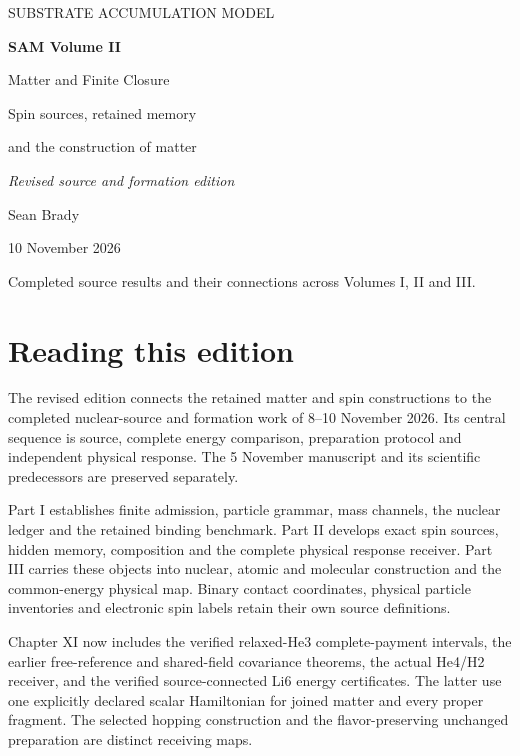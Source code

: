 
\newcommand{\VolumeRoman}{II}
\onecolumn\thispagestyle{empty}
\begin{center}\vspace*{0.8in}
{\small SUBSTRATE ACCUMULATION MODEL\par}\vspace{0.35in}
{\Huge\bfseries SAM Volume II\par}\vspace{0.15in}
{\LARGE Matter and Finite Closure\par}\vspace{0.25in}
{\large Spin sources, retained memory\par and the construction of matter\par\vspace{0.15in}\textit{Revised source and formation edition}\par}\vspace{0.4in}
{\Large Sean Brady\par}\vspace{0.12in}
{\normalsize 10 November 2026\par}\end{center}
\vfill\noindent Completed source results and their connections across Volumes I, II and III.
\clearpage{}\tableofcontents
\clearpage{}\section*{Reading this edition}
The revised edition connects the retained matter and spin constructions to
the completed nuclear-source and formation work of 8--10 November 2026.
Its central sequence is source, complete energy comparison, preparation
protocol and independent physical response. The 5 November manuscript and
its scientific predecessors are preserved separately.

Part I establishes finite admission, particle grammar, mass channels, the
nuclear ledger and the retained binding benchmark. Part II develops exact
spin sources, hidden memory, composition and the complete physical response
receiver. Part III carries these objects into nuclear, atomic and molecular
construction and the common-energy physical map. Binary contact coordinates,
physical particle inventories and electronic spin labels retain their own
source definitions.

Chapter XI now includes the verified relaxed-He3 complete-payment intervals,
the earlier free-reference and shared-field covariance theorems, the actual
He4/H2 receiver, and the verified source-connected Li6 energy certificates.
The latter use one explicitly declared scalar Hamiltonian for joined matter
and every proper fragment. The selected hopping construction and the
flavor-preserving unchanged preparation are distinct receiving maps.

